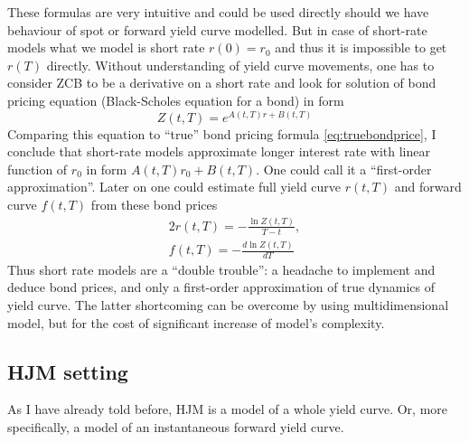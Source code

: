 \documentclass[11pt]{article} %
\begin{document}
These formulas are very intuitive and could be used directly should we have behaviour of spot or forward yield curve modelled. But in case of short-rate models what we model is short rate $r(0) = r_0$ and thus it is impossible to get $r(T)$ directly. Without understanding of yield curve movements, one has to consider ZCB to be a derivative on a short rate and look for solution of bond pricing equation (Black-Scholes equation for a bond) in form 
\begin{equation} 
Z(t,T) = e^{A(t,T) r + B(t,T)}
\end{equation}
Comparing this equation to ``true'' bond pricing formula \eqref{eq:truebondprice}, I conclude that short-rate models approximate longer interest rate with linear function of $r_0$ in form $A(t,T) r_0 + B(t,T)$. One could call it a ``first-order approximation''. Later on one could estimate full yield curve $r(t,T)$ and forward curve $f(t,T)$ from these bond prices
\begin{alignat}{2}
r(t,T) = -\frac{\ln Z(t,T)}{T-t},\\
\label{eq:fwdfrombond} f(t,T) = -\frac{d \ln Z(t,T)}{dT}
\end{alignat}
Thus short rate models are a ``double trouble'': a headache to implement and deduce bond prices, and only a first-order approximation of true dynamics of yield curve. The latter shortcoming can be overcome by using multidimensional model, but for the cost of significant increase of model's complexity.\\

\subsection{HJM setting}

As I have already told before, HJM is a model of a whole yield curve. Or, more specifically, a model of an instantaneous forward yield curve.\\
\end{document}
